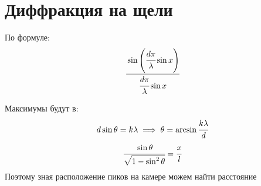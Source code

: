 \section{Диффракция на щели}
По формуле:
\begin{equation}
    \cfrac{\sin \left( \cfrac{d\pi}{\lambda}\sin{x} \right)}{\cfrac{d\pi}{\lambda}\sin{x}}
\end{equation}

Максимумы будут в:
\begin{equation}
    d\sin{\theta} = k \lambda \implies \theta = \arcsin{\cfrac{k\lambda}{d}}
\end{equation}
\begin{equation}
    \cfrac{\sin{\theta}}{\sqrt{1 - \sin^2 \theta}} = \cfrac{x}{l}
\end{equation}
Поэтому зная расположение пиков на камере можем найти расстояние


